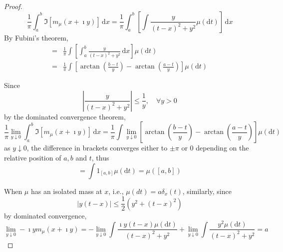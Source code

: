 \begin{proof}
    \begin{equation*}
        \frac{1}{\pi}\int_{a}^{b}\Im\left[m_{\mu}(x+\imath y)\right]\,\mathrm{d}x=\frac{1}{\pi}\int_{a}^{b}\left[\int\frac{y}{(t-x)^{2}+y^{2}}\mu(\mathrm{d}t)\right]\,\mathrm{d}x
    \end{equation*}
    By Fubini's theorem,
    \begin{equation*}
        \begin{aligned}
            = & \frac{1}{\pi}\int\left[\int_{a}^{b}\frac{y}{(t-x)^{2}+y^{2}}\,\mathrm{d}x\right]\mu(\mathrm{d}t)                  \\
            = & \frac{1}{\pi}\int\left[\arctan\left(\frac{b-t}{y}\right)-\arctan\left(\frac{a-t}{y}\right)\right]\mu(\mathrm{d}t)
        \end{aligned}
    \end{equation*}

    Since
    \begin{equation*}
        \left|\frac{y}{(t-x)^{2}+y^{2}}\right|\leq\frac{1}{y},\quad\forall y>0
    \end{equation*}
    by the dominated convergence theorem,
    \begin{equation*}
        \frac{1}{\pi}\lim_{y\downarrow 0}\int_{a}^{b}\Im\left[m_{\mu}(x+\imath y)\right]\,\mathrm{d}x=\frac{1}{\pi}\int\lim_{y\downarrow 0}\left[\arctan\left(\frac{b-t}{y}\right)-\arctan\left(\frac{a-t}{y}\right)\right]\mu(\mathrm{d}t)
    \end{equation*}
    as $y\downarrow 0$, the difference in brackets converges either to $\pm \pi$ or 0 depending on the relative position of $a,b$ and $t$, thus
    \begin{equation*}
        =\int\mathrm{1}_{[a,b]}\mu(\mathrm{d}t)=\mu\left([a,b]\right)
    \end{equation*}

    When $\mu$ has an isolated mass at $x$, i.e., $\mu(d t)=a \delta_{x}(t)$, similarly, since
    \begin{equation*}
        |y(t-x)|\leq\frac{1}{2}\left(y^{2}+(t-x)^{2}\right)
    \end{equation*}
    by dominated convergence,
    \begin{equation*}
        \lim_{y\downarrow 0}-\imath ym_{\mu}(x+\imath y)=-\lim_{y\downarrow 0}\int\frac{\imath y(t-x)\mu(\mathrm{d}t)}{(t-x)^{2}+y^{2}}+\lim_{y\downarrow 0}\int\frac{y^{2}\mu(\mathrm{d}t)}{(t-x)^{2}+y^{2}}=a
    \end{equation*}
\end{proof}

